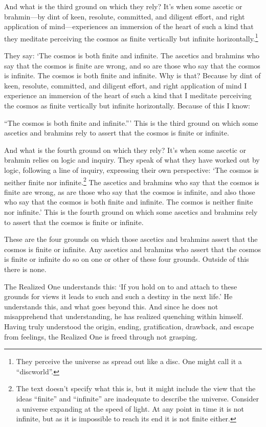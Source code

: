 \documentclass[12pt,openany]{book}%
\begin{document}
And what is the third ground on which they rely? It’s when some ascetic or brahmin—by dint of keen, resolute, committed, and diligent effort, and right application of mind—experiences an immersion of the heart of such a kind that they meditate perceiving the cosmos as finite vertically but infinite horizontally.\footnote{They perceive the universe as spread out like a disc. One might call it a “discworld”. } 

They say: ‘The cosmos is both finite and infinite. The ascetics and brahmins who say that the cosmos is finite are wrong, and so are those who say that the cosmos is infinite. The cosmos is both finite and infinite. Why is that? Because by dint of keen, resolute, committed, and diligent effort, and right application of mind I experience an immersion of the heart of such a kind that I meditate perceiving the cosmos as finite vertically but infinite horizontally. Because of this I know: 

“The cosmos is both finite and infinite.”’ This is the third ground on which some ascetics and brahmins rely to assert that the cosmos is finite or infinite. 

And what is the fourth ground on which they rely? It’s when some ascetic or brahmin relies on logic and inquiry. They speak of what they have worked out by logic, following a line of inquiry, expressing their own perspective: ‘The cosmos is neither finite nor infinite.\footnote{The text doesn’t specify what this is, but it might include the view that the ideas “finite” and “infinite” are inadequate to describe the universe. Consider a universe expanding at the speed of light. At any point in time it is not infinite, but as it is impossible to reach its end it is not finite either. } The ascetics and brahmins who say that the cosmos is finite are wrong, as are those who say that the cosmos is infinite, and also those who say that the cosmos is both finite and infinite. The cosmos is neither finite nor infinite.’ This is the fourth ground on which some ascetics and brahmins rely to assert that the cosmos is finite or infinite. 

These are the four grounds on which those ascetics and brahmins assert that the cosmos is finite or infinite. Any ascetics and brahmins who assert that the cosmos is finite or infinite do so on one or other of these four grounds. Outside of this there is none. 

The Realized One understands this: ‘If you hold on to and attach to these grounds for views it leads to such and such a destiny in the next life.’ He understands this, and what goes beyond this. And since he does not misapprehend that understanding, he has realized quenching within himself. Having truly understood the origin, ending, gratification, drawback, and escape from feelings, the Realized One is freed through not grasping. 
\end{document}
